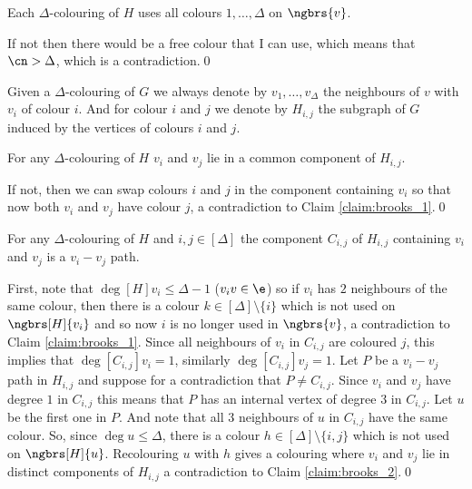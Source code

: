 \begin{prf}
\begin{itemize}
        \begin{customclaim}{1}
        \label{claim:brooks_1}
            Each $\Delta$-colouring of $H$ uses all colours $1, \dots, \Delta$ on $\ngbrs{v}$.
        \end{customclaim}
        \begin{prf}
            If not then there would be a free colour that I can use, which means that $\cn > \Delta$, which is a contradiction.\qed
        \end{prf}
        Given a $\Delta$-colouring of $G$ we always denote by $v_1, \dots, v_\Delta$ the neighbours of $v$ with $v_i$ of colour $i$. And for colour $i$ and $j$ we denote by $H_{i, j}$ the subgraph of $G$ induced by the vertices of colours $i$ and $j$.
        \begin{customclaim}{2}
        \label{claim:brooks_2}
            For any $\Delta$-colouring of $H$ $v_i$ and $v_j$ lie in a common component of $H_{i, j}$.
        \end{customclaim}
        \begin{prf}
            If not, then we can swap colours $i$ and $j$ in the component containing $v_i$ so that now both $v_i$ and $v_j$ have colour $j$, a contradiction to Claim \ref{claim:brooks_1}.\qed
        \end{prf}
        \begin{customclaim}{3}
        \label{claim:brooks_3}
            For any $\Delta$-colouring of $H$ and $i, j \in [\Delta]$ the component $C_{i, j}$ of $H_{i, j}$ containing $v_i$ and $v_j$ is a $v_i - v_j$ path.
        \end{customclaim}
        \begin{prf}
            First, note that $\deg[H]{v_i} \leq \Delta - 1$ ($v_iv \in \e$) so if $v_i$ has $2$ neighbours of the same colour, then there is a colour $k \in [\Delta] \setminus \{i\}$ which is not used on $\ngbrs[H]{v_i}$ and so now $i$ is no longer used in $\ngbrs{v}$, a contradiction to Claim \ref{claim:brooks_1}. Since all neighbours of $v_i$ in $C_{i, j}$ are coloured $j$, this implies that $\deg[C_{i, j}]{v_i} = 1$, similarly $\deg[C_{i, j}]{v_j} = 1$. Let $P$ be a $v_i - v_j$ path in $H_{i, j}$ and suppose for a contradiction that $P \neq C_{i, j}$. Since $v_i$ and $v_j$ have degree $1$ in $C_{i, j}$ this means that $P$ has an internal vertex of degree $3$ in $C_{i, j}$. Let $u$ be the first one in $P$. And note that all $3$ neighbours of $u$ in $C_{i, j}$ have the same colour. So, since $\deg{u} \leq \Delta$, there is a colour $h \in [\Delta] \setminus \{i, j\}$ which is not used on $\ngbrs[H]{u}$. Recolouring $u$ with $h$ gives a colouring where $v_i$ and $v_j$ lie in distinct components of $H_{i, j}$ a contradiction to Claim \ref{claim:brooks_2}.\qed

\end{prf}
\end{itemize}
\end{prf}
